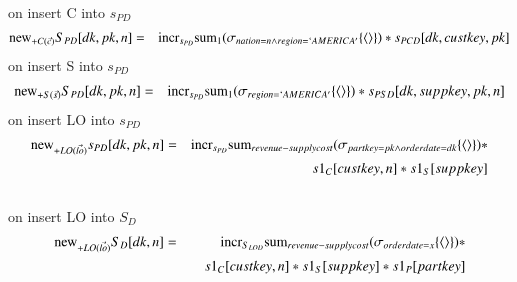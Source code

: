 \\
on insert C into $s_{PD}$
\begin{eqnarray}
\mathrm{new}_{+C(\vec{c})} S_{PD} [dk, pk, n] &=& \mathrm{incr}_{s_{PD}}
\mathrm{sum}_{1} (\sigma_{nation = n \wedge region = `AMERICA'} \{{\langle\rangle}\} )* s_{PCD}[dk, custkey, pk]
\end{eqnarray}
on insert S into $s_{PD}$
\begin{eqnarray}
\mathrm{new}_{+S(\vec{s})} S_{PD} [dk, pk, n] &=& \mathrm{incr}_{s_{PD}}
\mathrm{sum}_{1} (\sigma_{region = `AMERICA'} \{{\langle\rangle}\} )* s_{PSD} [dk, suppkey, pk, n]
\end{eqnarray}
on insert LO into $s_{PD}$
\begin{eqnarray}
\mathrm{new}_{+LO (\vec{lo})} s_{PD} [dk, pk, n] &=& \mathrm{incr}_{s_{PD}}
\mathrm{sum}_{revenue-supplycost} (\sigma_{partkey = pk \wedge orderdate = dk} \{{\langle\rangle}\} ) * 
\\\nonumber&& \qquad
s1_{C}[custkey, n] * s1_{S} [suppkey]
\end{eqnarray}
\\
on insert LO into $S_{D}$
\begin{eqnarray}
\mathrm{new}_{+LO(\vec{lo})} S_{D} [dk, n] 
&=& \mathrm{incr}_{S_{LOD}}
\mathrm{sum}_{revenue-supplycost} (\sigma_{orderdate = x} \{{\langle\rangle}\}) *   
\\\nonumber&& \quad s1_{C} [custkey, n] * s1_{S} [suppkey] * s1_{P} [partkey]
\end{eqnarray}
